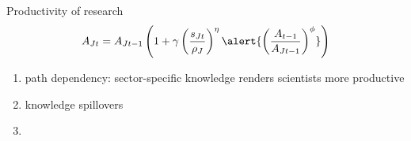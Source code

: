 \documentclass[11pt,aspectratio=169]{beamer}
\begin{document}
\addtocounter{framenumber}{-1}
\begin{frame}{Productivity of research}
	\large
	\begin{align*}
		A_{Jt}={A_{Jt-1}}\left(1+\gamma\left(\frac{s_{Jt}}{\rho_J}\right)^\eta\alert{\left(\frac{A_{t-1}}{A_{Jt-1}}\right)^\phi}\right)
	\end{align*}
\normalsize
	\begin{enumerate}
		\item path dependency: sector-specific knowledge renders scientists more productive
		\item \alert{knowledge spillovers} %
	\item[] %
	\end{enumerate}
\end{frame}
\end{document}

